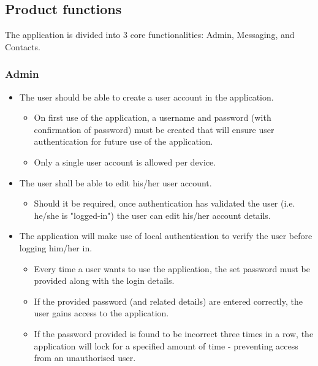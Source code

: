 \subsection{Product functions}
The application is divided into 3 core functionalities: Admin, Messaging, and Contacts.

\subsubsection{Admin}
\begin{itemize}
\item The user should be able to create a user account in the application.
\begin{itemize}
\item On first use of the application, a username and password (with confirmation of password) must be created that will ensure user authentication for future use of the application.
\item Only a single user account is allowed per device.
\end{itemize}
\item The user shall be able to edit his/her user account.
\begin{itemize}
\item Should it be required, once authentication has validated the user (i.e. he/she is "logged-in") the user can edit his/her account details.
\end{itemize}
\item The application will make use of local authentication to verify the user before logging him/her in.
\begin{itemize}
\item Every time a user wants to use the application, the set password must be provided along with the login details.
\item If the provided password (and related details) are entered correctly, the user gains access to the application.
\item If the password provided is found to be incorrect three times in a row, the application will lock for a specified amount of time - preventing access from an unauthorised user.
\end{itemize}
\end{itemize}

